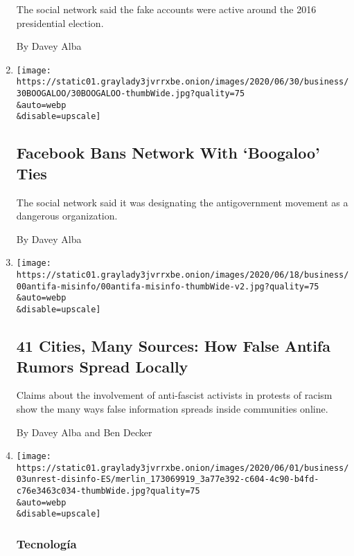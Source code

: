 \begin{enumerate}
  The social network said the fake accounts were active around the 2016
  presidential election.

  By Davey Alba
\item
  \href{/2020/06/30/technology/facebook-ban-boogaloo.html}{}

  \texttt{[image: https://static01.graylady3jvrrxbe.onion/images/2020/06/30/business/30BOOGALOO/30BOOGALOO-thumbWide.jpg?quality=75\\\&auto=webp\\\&disable=upscale]}

  \hypertarget{facebook-bans-network-with-boogaloo-ties}{%
  \subsection{Facebook Bans Network With `Boogaloo'
  Ties}\label{facebook-bans-network-with-boogaloo-ties}}

  The social network said it was designating the antigovernment movement
  as a dangerous organization.

  By Davey Alba
\item
  \href{/2020/06/22/technology/antifa-local-disinformation.html}{}

  \texttt{[image: https://static01.graylady3jvrrxbe.onion/images/2020/06/18/business/00antifa-misinfo/00antifa-misinfo-thumbWide-v2.jpg?quality=75\\\&auto=webp\\\&disable=upscale]}

  \hypertarget{41-cities-many-sources-how-false-antifa-rumors-spread-locally}{%
  \subsection{41 Cities, Many Sources: How False Antifa Rumors Spread
  Locally}\label{41-cities-many-sources-how-false-antifa-rumors-spread-locally}}

  Claims about the involvement of anti-fascist activists in protests of
  racism show the many ways false information spreads inside communities
  online.

  By Davey Alba and Ben Decker
\item
  \href{/es/2020/06/03/espanol/ciencia-y-tecnologia/george-floyd-desinformacion-fake-news.html}{}

  \texttt{[image: https://static01.graylady3jvrrxbe.onion/images/2020/06/01/business/03unrest-disinfo-ES/merlin\_173069919\_3a77e392-c604-4c90-b4fd-c76e3463c034-thumbWide.jpg?quality=75\\\&auto=webp\\\&disable=upscale]}

  \hypertarget{tecnologuxeda}{%
  \subsubsection{Tecnología}\label{tecnologuxeda}}


\end{enumerate}

